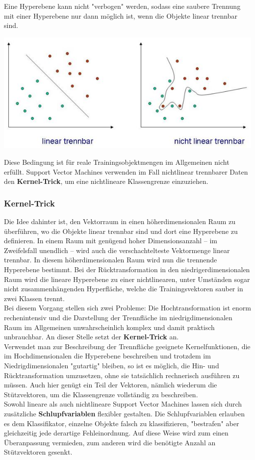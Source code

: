 \documentclass[12pt]{article}
\begin{document}
Eine Hyperebene kann nicht "verbogen" werden, sodass eine saubere Trennung mit einer Hyperebene nur dann möglich ist, wenn die Objekte linear trennbar sind.\\ 
\begin{center}  
\includegraphics{Trennbarkeit}
\end{center}
Diese Bedingung ist für reale Trainingsobjektmengen im Allgemeinen nicht erfüllt. Support Vector Machines verwenden im Fall nichtlinear trennbarer Daten den \textbf{Kernel-Trick}, um eine nichtlineare Klassengrenze einzuziehen.\\

\subsubsection{Kernel-Trick}
Die Idee dahinter ist, den Vektorraum in einen höherdimensionalen Raum zu überführen, wo die Objekte linear trennbar sind und dort eine Hyperebene zu definieren. In einem Raum mit genügend hoher Dimensionsanzahl – im Zweifelsfall unendlich – wird auch die verschachtelteste Vektormenge linear trennbar. In diesem höherdimensionalen Raum wird nun die trennende Hyperebene bestimmt. Bei der Rücktransformation in den niedrigerdimensionalen Raum wird die lineare Hyperebene zu einer nichtlinearen, unter Umständen sogar nicht zusammenhängenden Hyperfläche, welche die Trainingsvektoren sauber in zwei Klassen trennt.\\
Bei diesem Vorgang stellen sich zwei Probleme: Die Hochtransformation ist enorm rechenintensiv und die Darstellung der Trennfläche im niedrigdimensionalen Raum im Allgemeinen unwahrscheinlich komplex und damit praktisch unbrauchbar. An dieser Stelle setzt der \textbf{Kernel-Trick} an. \\ Verwendet man zur Beschreibung der Trennfläche geeignete Kernelfunktionen, die im Hochdimensionalen die Hyperebene beschreiben und trotzdem im Niedrigdimensionalen "gutartig" bleiben, so ist es möglich, die Hin- und Rücktransformation umzusetzen, ohne sie tatsächlich rechnerisch ausführen zu müssen. Auch hier genügt ein Teil der Vektoren, nämlich wiederum die Stützvektoren, um die Klassengrenze vollständig zu beschreiben.\\
Sowohl lineare als auch nichtlineare Support Vector Machines lassen sich durch zusätzliche \textbf{Schlupfvariablen} flexibler gestalten. Die Schlupfvariablen erlauben es dem Klassifikator, einzelne Objekte falsch zu klassifizieren, "bestrafen" aber gleichzeitig jede derartige Fehleinordnung. Auf diese Weise wird zum einen Überanpassung vermieden, zum anderen wird die benötigte Anzahl an Stützvektoren gesenkt.
\end{document}
